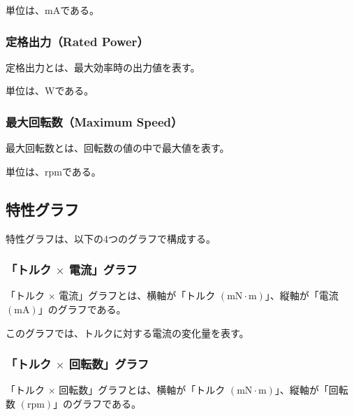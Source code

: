 単位は、$\mathrm{mA}$である。
\subsubsection{定格出力（Rated Power）}\label{sub:sub:teikakusyutu}
定格出力とは、最大効率時の出力値を表す。

単位は、$\mathrm{W}$である。
\subsubsection{最大回転数（Maximum Speed）}\label{sub:sub:saidaikai}
最大回転数とは、回転数の値の中で最大値を表す。

単位は、$\mathrm{rpm}$である。
\subsection{特性グラフ}\label{sub:tokuseigurahu}
特性グラフは、以下の4つのグラフで構成する。
\subsubsection{「トルク $\times$ 電流」グラフ}\label{sub:sub:torden}
「トルク $\times$ 電流」グラフとは、横軸が「トルク $(\mathrm{mN \cdot m})$」、縦軸が「電流 $(\mathrm{mA})$」のグラフである。

このグラフでは、トルクに対する電流の変化量を表す。
\subsubsection{「トルク $\times$ 回転数」グラフ}\label{sub:sub:torkaiten}
「トルク $\times$ 回転数」グラフとは、横軸が「トルク $(\mathrm{mN \cdot m})$」、縦軸が「回転数 $(\mathrm{rpm})$」のグラフである。

